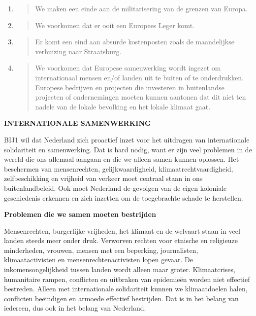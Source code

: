 \begin{enumerate}
\def\labelenumi{\arabic{enumi}.}
\item
  \begin{quote}
  We maken een einde aan de militarisering van de grenzen van Europa.
  \end{quote}
\item
  \begin{quote}
  We voorkomen dat er ooit een Europees Leger komt.
  \end{quote}
\item
  \begin{quote}
  Er komt een eind aan absurde kostenposten zoals de maandelijkse
  verhuizing naar Straatsburg.
  \end{quote}
\item
  \begin{quote}
  We voorkomen dat Europese samenwerking wordt ingezet om internationaal
  mensen en/of landen uit te buiten of te onderdrukken. Europese
  bedrijven en projecten die investeren in buitenlandse projecten of
  ondernemingen moeten kunnen aantonen dat dit niet ten nadele van de
  lokale bevolking en het lokale klimaat gaat.
  \end{quote}
\end{enumerate}

\textbf{INTERNATIONALE SAMENWERKING}

BIJ1 wil dat Nederland zich proactief inzet voor het uitdragen van
internationale solidariteit en samenwerking. Dat is hard nodig, want er
zijn veel problemen in de wereld die ons allemaal aangaan en die we
alleen samen kunnen oplossen. Het beschermen van mensenrechten,
gelijkwaardigheid, klimaatrechtvaardigheid, zelfbeschikking en vrijheid
van verkeer moet centraal staan in ons buitenlandbeleid. Ook moet
Nederland de gevolgen van de eigen koloniale geschiedenis erkennen en
zich inzetten om de toegebrachte schade te herstellen.

\textbf{Problemen die we samen moeten bestrijden}

Mensenrechten, burgerlijke vrijheden, het klimaat en de welvaart staan
in veel landen steeds meer onder druk. Verworven rechten voor etnische
en religieuze minderheden, vrouwen, mensen met een beperking,
journalisten, klimaatactivisten en mensenrechtenactivisten lopen gevaar.
De inkomensongelijkheid tussen landen wordt alleen maar groter.
Klimaatcrises, humanitaire rampen, conflicten en uitbraken van
epidemieën worden niet effectief bestreden. Alleen met internationale
solidariteit kunnen we klimaatdoelen halen, conflicten beëindigen en
armoede effectief bestrijden. Dat is in het belang van iedereen, dus ook
in het belang van Nederland.

